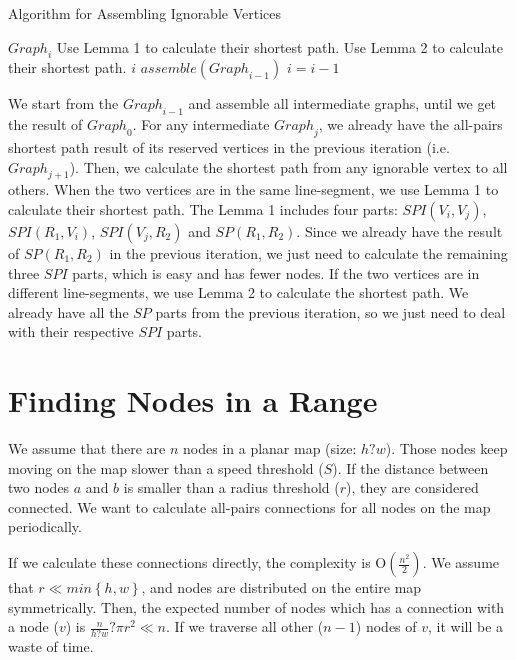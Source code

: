 \begin{algorithm} [hbtp]
\caption{Algorithm for Assembling Ignorable Vertices}\label{AlgAssIgnVer}
\begin{algorithmic}[1]
 {${Graph}_i$}
			\State Use Lemma 1 to calculate their shortest path.
		\Else
			\State Use Lemma 2 to calculate their shortest path.
		\EndIf
	\EndFor
\EndFor
\EndProcedure
{} {$i$}
	\State $assemble\left({Graph}_{i-1}\right)$
	\State $i=i-1$
\EndWhile
\EndProcedure
\end{algorithmic}
\end{algorithm}

\noindent We start from the ${Graph}_{i-1}$ and assemble all intermediate graphs, until we get the result of ${Graph}_0$. For any intermediate ${Graph}_j$, we already have the all-pairs shortest path result of its reserved vertices in the previous iteration (i.e. ${Graph}_{j+1}$). Then, we calculate the shortest path from any ignorable vertex to all others. When the two vertices are in the same line-segment, we use Lemma 1 to calculate their shortest path. The Lemma 1 includes four parts: $SPI\left(V_i,V_j\right)$, $SPI\left(R_1,V_i\right)$, $SPI\left(V_j,R_2\right)$ and $SP\left(R_1,R_2\right)$. Since we already have the result of $SP\left(R_1,R_2\right)$ in the previous iteration, we just need to calculate the remaining three $SPI$ parts, which is easy and has fewer nodes. If the two vertices are in different line-segments, we use Lemma 2 to calculate the shortest path. We already have all the $SP$ parts from the previous iteration, so we just need to deal with their respective $SPI$ parts.


\section{ Finding Nodes in a Range}

\noindent We assume that there are $n$ nodes in a planar map (size: $h?w$). Those nodes keep moving on the map slower than a speed threshold ($S$). If the distance between two nodes $a$ and $b$ is smaller than a radius threshold ($r$), they are considered connected. We want to calculate all-pairs connections for all nodes on the map periodically. 

\noindent If we calculate these connections directly, the complexity is $\mathrm{O}\left(\frac{n^2}{2}\right)$. We assume that $r\ll min\left\{h,w\right\}$, and nodes are distributed on the entire map symmetrically. Then, the expected number of nodes which has a connection with a node ($v$) is $\frac{n}{h\mathrm{?}w}\mathrm{?}\pi r^2\mathrm{\ll }n$. If we traverse all other ($n-1$) nodes of $v$, it will be a waste of time.

